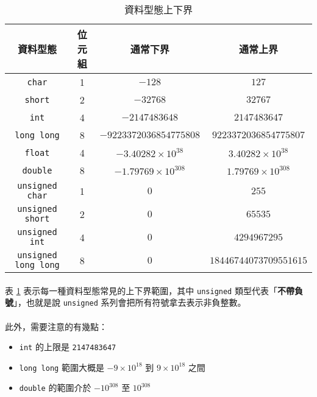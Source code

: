 \documentclass[12pt,a4paper,oneside]{article}
\begin{document}
\begin{CJK}{UTF8}{bkai}
\begin{table}[h!]
\centering
\begin{tabular}{|c|c|c|c|}
\hline
\textbf{資料型態} & \textbf{位元組} & \textbf{通常下界} & \textbf{通常上界}\\
\hline\hline
\lstinline!char!      & 1 & $-128$        & $127$       \\
\hline
\lstinline!short!     & 2 & $-32768$      & $32767$     \\
\hline
\lstinline!int!       & 4 & $-2147483648$ & $2147483647$\\
\hline
\lstinline!long long! & 8 & $-9223372036854775808$ & $9223372036854775807$\\
\hline
\lstinline!float!     & 4 & $-3.40282\times{10^{38}}$ & $3.40282\times{10^{38}}$\\
\hline
\lstinline!double!    & 8 & $-1.79769\times{10^{308}}$ & $1.79769\times{10^{308}}$\\
\hline
\lstinline!unsigned char!      & 1 & $0$ & $255$\\
\hline
\lstinline!unsigned short!     & 2 & $0$ & $65535$\\
\hline
\lstinline!unsigned int!       & 4 & $0$ & $4294967295$\\
\hline
\lstinline!unsigned long long! & 8 & $0$ & $18446744073709551615$\\
\hline
\end{tabular}
\caption{資料型態上下界}
\label{program:struct:table:datatype:limit}
\end{table}

\paragraph{}表 \ref{program:struct:table:datatype:limit} 表示每一種資料型態常見的上下界範圍，其中 \lstinline!unsigned! 類型代表「\textbf{不帶負號}」，也就是說 \lstinline!unsigned! 系列會把所有符號拿去表示非負整數。
\paragraph{}此外，需要注意的有幾點：
\begin{itemize}
\item \lstinline!int! 的上限是 \lstinline!2147483647!
\item \lstinline!long long! 範圍大概是 $-9\times{10^{18}}$ 到 $9\times{10^{18}}$ 之間
\item \lstinline!double! 的範圍介於 $-{10}^{308}$ 至 ${10}^{308}$
\end{itemize}

\end{CJK}
\end{document}
